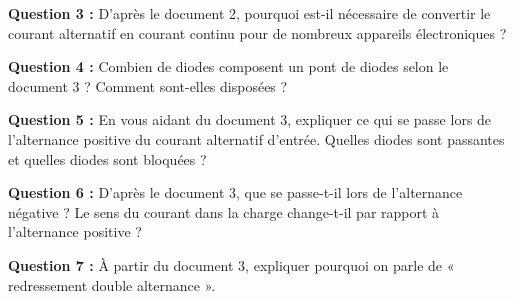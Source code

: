 \documentclass[11pt,a4paper]{article}
\begin{document}
\textbf{Question 3 :} D'après le document 2, pourquoi est-il nécessaire de convertir le courant alternatif en courant continu pour de nombreux appareils électroniques ?

\vspace{0.3cm}
\noindent
\fbox{\parbox{\dimexpr\textwidth-2\fboxsep-2\fboxrule\relax}{
\vspace{2cm}
\hspace{1cm}
\vspace{0.1cm}
}}
\vspace{0.5cm}

\textbf{Question 4 :} Combien de diodes composent un pont de diodes selon le document 3 ? Comment sont-elles disposées ?

\vspace{0.3cm}
\noindent
\fbox{\parbox{\dimexpr\textwidth-2\fboxsep-2\fboxrule\relax}{
\vspace{2cm}
\hspace{1cm}
\vspace{0.1cm}
}}
\vspace{0.5cm}

\textbf{Question 5 :} En vous aidant du document 3, expliquer ce qui se passe lors de l'alternance positive du courant alternatif d'entrée. Quelles diodes sont passantes et quelles diodes sont bloquées ?

\vspace{0.3cm}
\noindent
\fbox{\parbox{\dimexpr\textwidth-2\fboxsep-2\fboxrule\relax}{
\vspace{3cm}
\hspace{1cm}
\vspace{0.1cm}
}}
\vspace{0.5cm}

\newpage 

\textbf{Question 6 :} D'après le document 3, que se passe-t-il lors de l'alternance négative ? Le sens du courant dans la charge change-t-il par rapport à l'alternance positive ?

\vspace{0.3cm}
\noindent
\fbox{\parbox{\dimexpr\textwidth-2\fboxsep-2\fboxrule\relax}{
\vspace{3cm}
\hspace{1cm}
\vspace{0.1cm}
}}
\vspace{0.5cm}

\textbf{Question 7 :} À partir du document 3, expliquer pourquoi on parle de « redressement double alternance ».

\vspace{0.3cm}
\noindent
\fbox{\parbox{\dimexpr\textwidth-2\fboxsep-2\fboxrule\relax}{
\vspace{2cm}
\hspace{1cm}
\vspace{0.1cm}
}}
\vspace{0.5cm}
\end{document}
